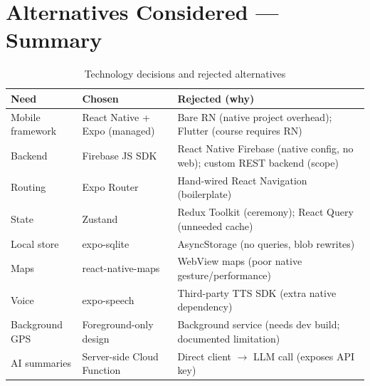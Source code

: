 \documentclass[12pt, a4paper]{report}
\begin{document}
\section{Alternatives Considered --- Summary}
\begin{table}[H]
\centering
\caption{Technology decisions and rejected alternatives}
\label{tab:alt}
\small
\begin{tabularx}{\textwidth}{@{}l L L@{}}
\toprule
\textbf{Need} & \textbf{Chosen} & \textbf{Rejected (why)} \\
\midrule
Mobile framework & React Native + Expo (managed) & Bare RN (native project
  overhead); Flutter (course requires RN) \\
Backend & Firebase JS SDK & React Native Firebase (native config, no web);
  custom REST backend (scope) \\
Routing & Expo Router & Hand-wired React Navigation (boilerplate) \\
State & Zustand & Redux Toolkit (ceremony); React Query (unneeded cache) \\
Local store & expo-sqlite & AsyncStorage (no queries, blob rewrites) \\
Maps & react-native-maps & WebView maps (poor native gesture/perform\-ance) \\
Voice & expo-speech & Third-party TTS SDK (extra native dependency) \\
Background GPS & Foreground-only design & Background service (needs dev
  build; documented limitation) \\
AI summaries & Server-side Cloud Function & Direct client $\rightarrow$ LLM
  call (exposes API key) \\
\bottomrule
\end{tabularx}
\end{table}
\end{document}
